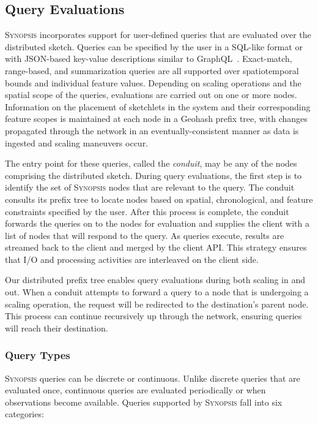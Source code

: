 \subsection{Query Evaluations}
\label{subsec:query-eval}
\textsc{Synopsis} incorporates support for user-defined queries that are evaluated over the distributed sketch.  Queries can be specified by the user in a SQL-like format or with JSON-based key-value descriptions similar to GraphQL~\cite{graphql}. Exact-match, range-based, and summarization queries are all supported over spatiotemporal bounds and individual feature values. Depending on scaling operations and the spatial scope of the queries, evaluations are carried out on one or more nodes. Information on the placement of sketchlets in the system and their corresponding feature scopes is maintained at each node in a Geohash prefix tree, with changes propagated through the network in an eventually-consistent manner as data is ingested and scaling maneuvers occur.

The entry point for these queries, called the \emph{conduit}, may be any of the nodes comprising the distributed sketch. During query evaluations, the first step is to identify the set of \textsc{Synopsis} nodes that are relevant to the query. The conduit consults its prefix tree to locate nodes based on spatial, chronological, and feature constraints specified by the user. After this process is complete, the conduit forwards the queries on to the nodes for evaluation and supplies the client with a list of nodes that will respond to the query. As queries execute, results are streamed back to the client and merged by the client API. This strategy ensures that I/O and processing activities are interleaved on the client side.

Our distributed prefix tree enables query evaluations during both scaling in and out. When a conduit attempts to forward a query to a node that is undergoing a scaling operation, the request will be redirected to the destination's parent node. This process can continue recursively up through the network, ensuring queries will reach their destination.

\subsubsection{Query Types}
\textsc{Synopsis} queries can be discrete or continuous. Unlike discrete queries that are evaluated once, continuous queries are evaluated periodically or when observations become available. Queries supported by \textsc{Synopsis} fall into six categories:


